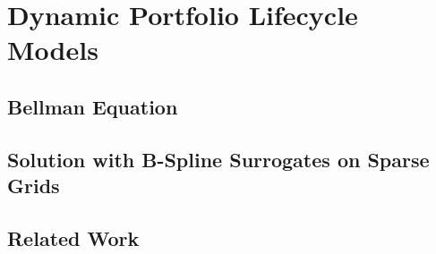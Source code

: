 \section{Dynamic Portfolio Lifecycle Models}
\label{sec:81models}

\blindtext{}



\subsection{Bellman Equation}
\label{sec:811bellmanEquation}

\blindtext{}



\subsection{Solution with B-Spline Surrogates on Sparse Grids}
\label{sec:812surrogates}

\blindtext{}



\subsection{Related Work}
\label{sec:813relatedWork}

\blindtext{}
